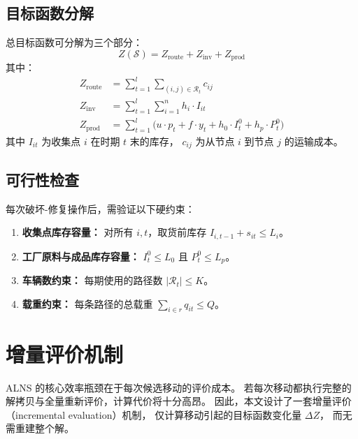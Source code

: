 \documentclass{article}
\begin{document}
\subsection{目标函数分解}

总目标函数可分解为三个部分：
\begin{equation}
  Z(\mathcal{S}) = Z_{\text{route}} + Z_{\text{inv}} + Z_{\text{prod}}
  \label{eq:alns-objective}
\end{equation}
其中：
\begin{align}
  Z_{\text{route}}
    &= \sum_{t=1}^{l} \sum_{(i,j) \in \mathcal{R}_t} c_{ij}
    \label{eq:alns-route-cost} \\
  Z_{\text{inv}}
    &= \sum_{t=1}^{l} \sum_{i=1}^{n} h_i \cdot I_{it}
    \label{eq:alns-holding-cost} \\
  Z_{\text{prod}}
    &= \sum_{t=1}^{l} \bigl( u \cdot p_t + f \cdot y_t
       + h_0 \cdot I^0_t + h_p \cdot P^0_t \bigr)
    \label{eq:alns-prod-cost}
\end{align}
其中 $I_{it}$ 为收集点 $i$ 在时期 $t$ 末的库存，
$c_{ij}$ 为从节点 $i$ 到节点 $j$ 的运输成本。

\subsection{可行性检查}

每次破坏-修复操作后，需验证以下硬约束：

\begin{enumerate}
  \item \textbf{收集点库存容量：}
    对所有 $i,t$，取货前库存
    $I_{i,t-1} + s_{it} \leq L_i$。
  \item \textbf{工厂原料与成品库存容量：}
    $I^0_t \leq L_0$ 且 $P^0_t \leq L_p$。
  \item \textbf{车辆数约束：}
    每期使用的路径数 $|\mathcal{R}_t| \leq K$。
  \item \textbf{载重约束：}
    每条路径的总载重 $\sum_{i \in r} q_{it} \leq Q$。
\end{enumerate}

\section{增量评价机制}
\label{sec:alns-incremental}

ALNS 的核心效率瓶颈在于每次候选移动的评价成本。
若每次移动都执行完整的解拷贝与全量重新评价，计算代价将十分高昂。
因此，本文设计了一套增量评价（incremental evaluation）机制，
仅计算移动引起的目标函数变化量 $\Delta Z$，
而无需重建整个解。
\end{document}
